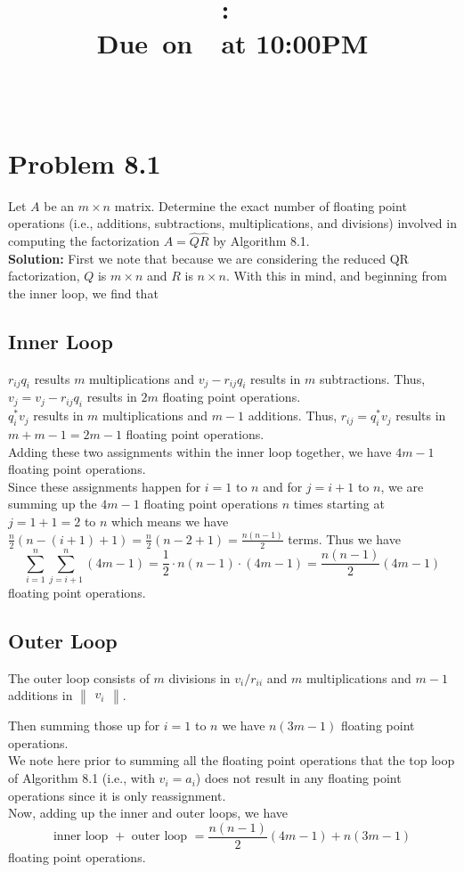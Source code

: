 \documentclass{article}
\title{
    \vspace{2in}
    \textmd{\textbf{\hmwkClass:\ \hmwkTitle}}\\
    \normalsize\vspace{0.1in}\small{Due\ on\ \hmwkDueDate\ at 10:00PM}\\
    \vspace{0.1in}\large{\textit{\hmwkClassInstructor\ \hmwkClassTime}}
    \vspace{3in}
}
\author{\hmwkAuthorName}
\date{}
\begin{document}
\maketitle

\pagebreak
\section*{Problem 8.1}
Let $A$ be an $m \times n$ matrix. Determine the exact number of floating point operations (i.e., additions, subtractions, multiplications, and divisions) involved in computing the factorization $A = \hat{Q}\hat{R}$ by Algorithm 8.1. \\

\textbf{Solution:} First we note that because we are considering the reduced QR factorization, $Q$ is $m \times n$ and $R$ is $n \times n$. With this in mind, and beginning from the inner loop, we find that 
\subsection*{Inner Loop}
$r_{ij}q_i$ results $m$ multiplications and $v_j - r_{ij}q_i$ results in $m$ subtractions. Thus, $v_j = v_j - r_{ij}q_i$ results in $2m$ floating point operations.\\

$q_i^*v_j$ results in $m$ multiplications and $m-1$ additions. Thus, $r_{ij}=q_i^*v_j$ results in $m + m-1 = 2m - 1$ floating point operations.\\

Adding these two assignments within the inner loop together, we have $4m-1$ floating point operations.\\

Since these assignments happen $\text{for } i=1 \text{ to } n$ and for $j=i+1$ to $n$, we are summing up the $4m-1$ floating point operations $n$ times starting at $j=1+1=2$ to $n$ which means we have $\frac{n}{2}(n - (i + 1) + 1) = \frac{n}{2}(n - 2 + 1) = \frac{n(n-1)}{2}$ terms. Thus we have \[\sum_{i=1}^n\sum_{j=i+1}^n(4m-1) = \frac{1}{2}\cdot n(n-1) \cdot (4m-1) =  \frac{n(n-1)}{2}(4m-1)\] floating point operations.

\subsection*{Outer Loop}
The outer loop consists of $m$ divisions in $v_i/r_{ii}$ and $m$ multiplications and $m-1$ additions in $\begin{Vmatrix}
    v_i
\end{Vmatrix}.$

Then summing those up for $i=1$ to $n$ we have $n(3m-1)$ floating point operations. \\

We note here prior to summing all the floating point operations that the top loop of Algorithm 8.1 (i.e., with $v_i = a_i$) does not result in any floating point operations since it is only reassignment.\\

Now, adding up the inner and outer loops, we have \[\text{inner loop } + \text{ outer loop } = \frac{n(n-1)}{2}(4m-1) + n(3m-1)\] floating point operations.
\end{document}

